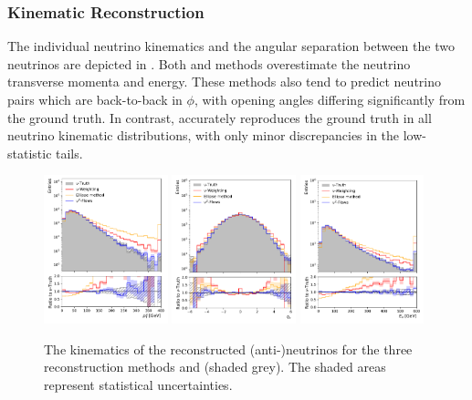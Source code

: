 \subsubsection{Kinematic Reconstruction}

The individual neutrino kinematics and the angular separation between the two neutrinos are depicted in .
Both \vweight and \ellipse methods overestimate the neutrino transverse momenta and energy.
These methods also tend to predict neutrino pairs which are back-to-back in $\phi$, with opening angles differing significantly from the ground truth.
In contrast, \vvflows accurately reproduces the ground truth in all neutrino kinematic distributions, with only minor discrepancies in the low-statistic tails.

\begin{figure}[htpb]
    \centering
    \includegraphics[width=0.32\textwidth]{Figures/neutrino_unfolding/nu_reco/nuanti_nu_pt.pdf}
    \includegraphics[width=0.32\textwidth]{Figures/neutrino_unfolding/nu_reco/nuanti_nu_eta.pdf}
    \includegraphics[width=0.32\textwidth]{Figures/neutrino_unfolding/nu_reco/nuanti_nu_E.pdf}
    \caption{The kinematics of the reconstructed (anti-)neutrinos for the three reconstruction methods and \vtruth (shaded grey). The shaded areas represent statistical uncertainties.}
    \label{fig:vvbarkinematics}
\end{figure}

